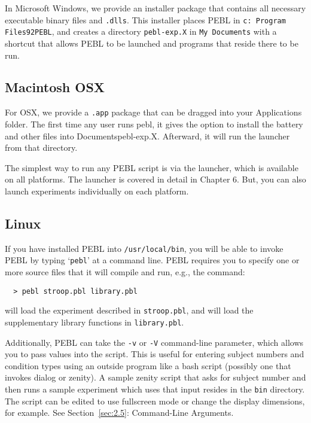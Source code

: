 In Microsoft Windows, we provide an installer package that contains
all necessary executable binary files and \texttt{.dlls}. This
installer places PEBL in \texttt{c: Program Files\char92PEBL},
and creates a directory \texttt{pebl-exp.X} in \texttt{My Documents}
with a shortcut that allows PEBL to be launched and programs that
reside there to be run.

\subsection{Macintosh OSX}

For OSX, we provide a \texttt{.app} package that can be dragged into your Applications folder.  The first time any user  runs pebl, it gives the option to install the battery and other files into Documentspebl-exp.X.  Afterward, it will run the launcher from that directory.



The simplest way to run any PEBL script is via the launcher, which is available on all platforms. The launcher is covered in detail in Chapter 6. But, you can also launch experiments individually on each platform.

\subsection{Linux}

If you have installed PEBL into \texttt{/usr/local/bin}, you will be able to
invoke PEBL by typing `\texttt{pebl}' at a command line.  PEBL requires you to
specify one or more source files that it will compile and run, e.g., the
command:
\begin{verbatim}
  > pebl stroop.pbl library.pbl
\end{verbatim}
will load the experiment described in \texttt{stroop.pbl}, and will load the
supplementary library functions in \texttt{library.pbl}.

Additionally, PEBL can take the \texttt{-v} or \texttt{-V} command-line parameter, which allows you to pass values into the script.  This is useful for
entering subject numbers and condition types using an outside program
like a bash script (possibly one that invokes dialog or zenity). A sample zenity script that asks for subject number and then runs a sample experiment which uses that input resides in the \texttt{bin} directory. The script can be edited to use fullscreen mode or change the display dimensions, for example. See Section~\ref{sec:2.5}: Command-Line Arguments.

